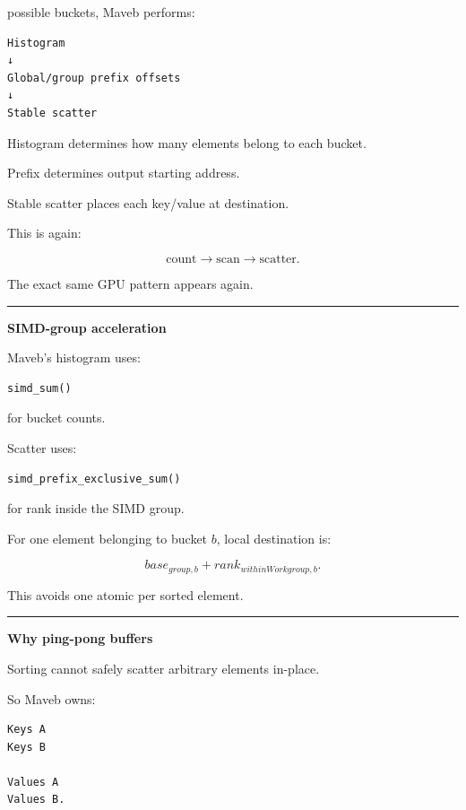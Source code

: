 possible buckets, Maveb performs:

\protect{}\label{asjrz1}%
\begin{verbatim}
Histogram
↓
Global/group prefix offsets
↓
Stable scatter
\end{verbatim}

Histogram determines how many elements belong to each bucket.

Prefix determines output starting address.

Stable scatter places each key/value at destination.

This is again:

\[
\boxed{
\text{count}
\rightarrow
\text{scan}
\rightarrow
\text{scatter}.
}
\]

The exact same GPU pattern appears again.

\begin{center}\rule{0.5\linewidth}{0.5pt}\end{center}

\textbf{SIMD-group acceleration}

Maveb's histogram uses:

\begin{verbatim}
simd_sum()
\end{verbatim}

for bucket counts.

Scatter uses:

\begin{verbatim}
simd_prefix_exclusive_sum()
\end{verbatim}

for rank inside the SIMD group.

For one element belonging to bucket \(b\), local destination is:

\[
base_{group,b}
+
rank_{withinWorkgroup,b}.
\]

This avoids one atomic per sorted element.

\begin{center}\rule{0.5\linewidth}{0.5pt}\end{center}

\textbf{Why ping-pong buffers}

Sorting cannot safely scatter arbitrary elements in-place.

So Maveb owns:

\protect{}\label{t35rr1}%
\begin{verbatim}
Keys A
Keys B

Values A
Values B.
\end{verbatim}

